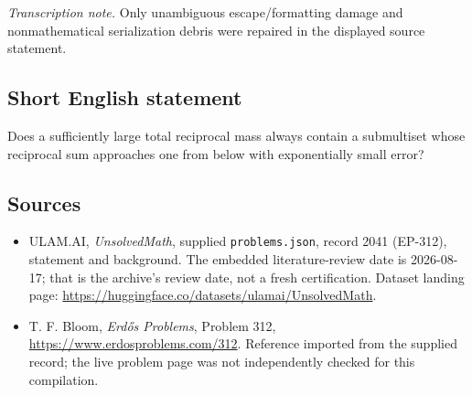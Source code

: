 \documentclass[11pt,a4paper]{article}
\begin{document}
{\small\emph{Transcription note.} Only unambiguous escape/formatting damage and nonmathematical serialization debris were repaired in the displayed source statement.}

\subsection{Short English statement}

Does a sufficiently large total reciprocal mass always contain a submultiset whose reciprocal sum approaches one from below with exponentially small error?

\subsection{Sources}

{\small

\begin{itemize}

\item[\hypertarget{source:2041:1}{S1}] ULAM.AI, \emph{UnsolvedMath}, supplied \texttt{problems.json}, record 2041 (EP-312), statement and background. The embedded literature-review date is 2026-08-17; that is the archive’s review date, not a fresh certification. Dataset landing page: \url{https://huggingface.co/datasets/ulamai/UnsolvedMath}.

\item[\hypertarget{source:2041:2}{S2}] T. F. Bloom, \emph{Erdős Problems}, Problem 312, \url{https://www.erdosproblems.com/312}. Reference imported from the supplied record; the live problem page was not independently checked for this compilation.

\end{itemize}

}

\label{end:2041}
\end{document}
